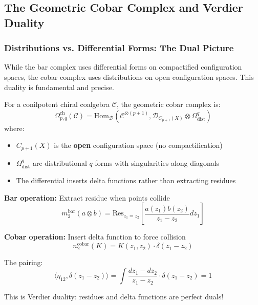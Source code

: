 
\subsection{The Geometric Cobar Complex and Verdier Duality}

\subsubsection{Distributions vs. Differential Forms: The Dual Picture}

While the bar complex uses differential forms on compactified configuration spaces, the cobar complex uses distributions on open configuration spaces. This duality is fundamental and precise.

\begin{definition}\label{def:geom-cobar-precise}
For a conilpotent chiral coalgebra $\mathcal{C}$, the geometric cobar complex is:
$$\Omega^{\text{ch}}_{p,q}(\mathcal{C}) = \text{Hom}_{\mathcal{D}}\left(\mathcal{C}^{\otimes(p+1)}, \mathcal{D}_{C_{p+1}(X)} \otimes \Omega^q_{\text{dist}}\right)$$
where:
\begin{itemize}
\item $C_{p+1}(X)$ is the \textbf{open} configuration space (no compactification)
\item $\Omega^q_{\text{dist}}$ are distributional $q$-forms with singularities along diagonals
\item The differential inserts delta functions rather than extracting residues
\end{itemize}
\end{definition}

\begin{example}
\textbf{Bar operation:} Extract residue when points collide
$$m_2^{\text{bar}}(a \otimes b) = \text{Res}_{z_1=z_2}\left[\frac{a(z_1)b(z_2)}{z_1-z_2}dz_1\right]$$

\textbf{Cobar operation:} Insert delta function to force collision
$$n_2^{\text{cobar}}(K) = K(z_1,z_2) \cdot \delta(z_1-z_2)$$

The pairing:
$$\langle \eta_{12}, \delta(z_1-z_2) \rangle = \int \frac{dz_1-dz_2}{z_1-z_2} \cdot \delta(z_1-z_2) = 1$$

This is Verdier duality: residues and delta functions are perfect duals!
\end{example}

